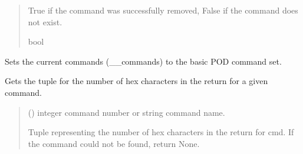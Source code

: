 \documentclass[letterpaper,10pt,english]{sphinxmanual}
\begin{document}
\begin{fulllineitems}
\begin{fulllineitems}
\begin{quote}
\begin{description}
\sphinxAtStartPar
True if the command was successfully removed, False if the command does not exist.

\sphinxAtStartPar
bool

\end{description}\end{quote}

\end{fulllineitems}


\begin{fulllineitems}
\label{\detokenize{PodCommands:PodCommands.POD_Commands.RestoreBasicCommands}}
\pysigstartsignatures
{}
\pysigstopsignatures
\sphinxAtStartPar
Sets the current commands (\_\_commands) to the basic POD command set.

\end{fulllineitems}


\begin{fulllineitems}
\label{\detokenize{PodCommands:PodCommands.POD_Commands.ReturnHexChar}}
\pysigstartsignatures
{}
\pysigstopsignatures
\sphinxAtStartPar
Gets the tuple for the number of hex characters in the return for a given command.
\begin{quote}\begin{description}
\sphinxAtStartPar
{} (\sphinxstyleliteralemphasis{\sphinxupquote{ | }}) \textendash{} integer command number or string command name.

\sphinxAtStartPar
Tuple representing the number of hex characters in the return for cmd. If the                 command could not be found, return None.


\end{description}
\end{quote}
\end{fulllineitems}
\end{fulllineitems}
\end{document}
